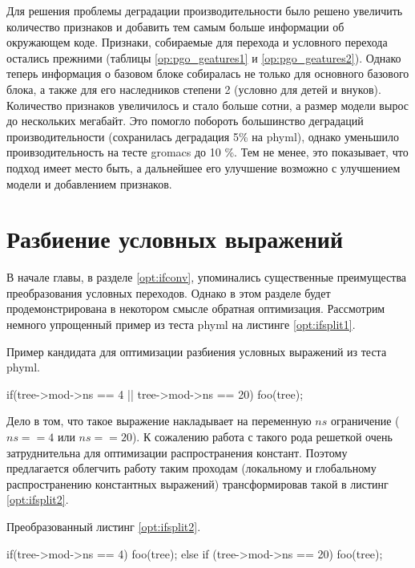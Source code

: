 Для решения проблемы деградации производительности было решено увеличить количество признаков и добавить тем самым больше информации об окружающем коде. Признаки, собираемые для перехода и условного перехода остались прежними (таблицы \ref{op:pgo_geatures1} и \ref{op:pgo_geatures2}). Однако теперь информация о базовом блоке собиралась не только для основного базового блока, а также для его наследников степени 2 (условно для детей и внуков). Количество признаков увеличилось и стало больше сотни, а размер модели вырос до нескольких мегабайт. Это помогло побороть большинство деградаций производительности (сохранилась деградация 5\% на phyml), однако уменьшило проивзодительность на тесте gromacs до 10 \%. Тем не менее, это показывает, что подход имеет место быть, а дальнейшее его улучшение возможно с улучшением модели и добавлением признаков.

\section{Разбиение условных выражений}  \label{ifsplit}
В начале главы, в разделе \ref{opt:ifconv}, упоминались существенные преимущества преобразования условных переходов. Однако в этом разделе будет продемонстрирована в некотором смысле обратная оптимизация. Рассмотрим немного упрощенный пример из теста phyml на листинге \ref{opt:ifsplit1}.
\begin{ListingEnv}[!h]
	\captiondelim{ } %
	\caption{Пример кандидата для оптимизации разбиения условных выражений из теста phyml.}\label{opt:ifsplit1}
	\begin{Verb}
		if(tree->mod->ns == 4 || tree->mod->ns == 20) {	
			foo(tree);
		}
	\end{Verb}
\end{ListingEnv}

Дело в том, что такое выражение накладывает на переменную $ns$ ограничение ($ns==4$ или $ns==20$). К сожалению работа с такого рода решеткой очень затруднительна для оптимизации распространения констант. Поэтому предлагается облегчить работу таким проходам (локальному и глобальному  распространению константных выражений) трансформировав такой в листинг \ref{opt:ifsplit2}.
\begin{ListingEnv}[!h]
	\captiondelim{ } %
	\caption{Преобразованный листинг \ref{opt:ifsplit2}.}\label{opt:ifsplit2}
	\begin{Verb}
		if(tree->mod->ns == 4) {	
			foo(tree);
		} else if (tree->mod->ns == 20) {
			foo(tree);
		}
	\end{Verb}
\end{ListingEnv}

